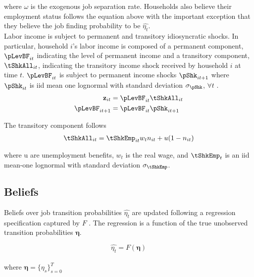 \documentclass[titlepage]{\econtex}\providecommand{\texname}{Dissertation-Proposal}
\begin{document}
where  $\omega$ is the exogenous job separation rate. Households also believe their employment status follows the equation above with the important exception that they believe the job finding probability to be $\hat{\eta_{t}}$.\\


Labor income is subject to permanent and transitory idiosyncratic shocks. In particular, household $i$'s labor income is composed of a permanent component, $\pLevBF_{it} $ indicating the level of permanent income and a transitory component, $\tShkAll_{it} $, indicating the transitory income shock received by household $i$ at time $t$. $\pLevBF_{it} $ is subject to permanent income shocks $\pShk_{it+1}$ where $\pShk_{it}$ is iid mean one lognormal with standard deviation $\sigma_\pShk$, $\forall t$ . \\

\begin{align*}
\mathbf{z}_{it} &= \pLevBF_{it}\tShkAll_{it} \\
\pLevBF_{it+1} &=\pLevBF_{it} \pShk_{it+1} \\
\end{align*}


The transitory component follows   \\


\begin{align*}
\tShkAll _{it}=  \tShkEmp_{it} w_{t} n_{it} + u ( 1 - n_{it} )
\end{align*}




where u are unemployment benefits, $w_{t}$ is the real wage, and $\tShkEmp_{t}$ is an iid mean-one lognormal with standard deviation $\sigma_{\tShkEmp}$.  



\hypertarget{Beliefs}{}
\subsection{Beliefs}

\label{subsec: Beliefs}

Beliefs over job transition probabilities $\hat{\eta_{t}}$ are updated following a regression specification captured by $F$ . The regression is a function of the true unobserved transition probabilities $\bm{\eta}$.

$$\hat{\eta_{t}} = F(\bm{\eta})$$ \\

where  $\bm{\eta} = \{\eta_{s}\}_{s=0}^{T}$ \\~\\ 
\end{document}

